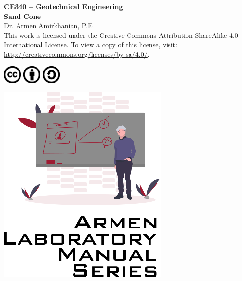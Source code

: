\documentclass[12pt]{article}
\newcommand{\CourseNum}{CE340}
\newcommand{\CourseName}{Geotechnical Engineering}
\newcommand{\LabTitle}{Sand Cone}
\begin{document}
\begin{titlepage}
\begin{flushright}
\LARGE{\textbf{\CourseNum{} -- \CourseName}}\\
\vfill
\Huge{\textbf{\LabTitle}}\\
    \vfill
    \large Dr. Armen Amirkhanian, P.E.\\
\vfill
\normalsize This work is licensed under the Creative Commons Attribution-ShareAlike 4.0 International License. To view a copy of this license, visit:
\href{http://creativecommons.org/licenses/by-sa/4.0/}{http://creativecommons.org/licenses/by-sa/4.0/}.

\includegraphics[width=0.07\textwidth]{cc.eps}
\includegraphics[width=0.07\textwidth]{by.eps}
\includegraphics[width=0.07\textwidth]{sa.eps}
\vfill

\includegraphics[width=0.3\linewidth]{Logo.eps}\\ 
 
  
\end{flushright}
\end{titlepage}
\end{document}
